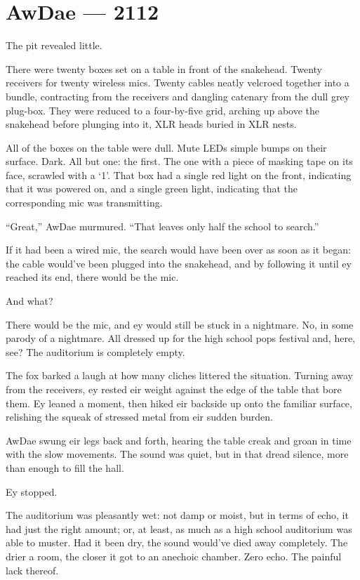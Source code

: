 \hypertarget{rj-brewster-2112}{%
\chapter*{AwDae — 2112}\label{rj-brewster-2112}}

The pit revealed little.

There were twenty boxes set on a table in front of the snakehead. Twenty receivers for twenty wireless mics. Twenty cables neatly velcroed together into a bundle, contracting from the receivers and dangling catenary from the dull grey plug-box. They were reduced to a four-by-five grid, arching up above the snakehead before plunging into it, XLR heads buried in XLR nests.

All of the boxes on the table were dull. Mute LEDs simple bumps on their surface. Dark. All but one: the first. The one with a piece of masking tape on its face, scrawled with a `1'. That box had a single red light on the front, indicating that it was powered on, and a single green light, indicating that the corresponding mic was transmitting.

``Great,'' AwDae murmured. ``That leaves only half the school to search.''

If it had been a wired mic, the search would have been over as soon as it began: the cable would've been plugged into the snakehead, and by following it until ey reached its end, there would be the mic.

And what?

There would be the mic, and ey would still be stuck in a nightmare. No, in some parody of a nightmare. All dressed up for the high school pops festival and, here, see? The auditorium is completely empty.

The fox barked a laugh at how many cliches littered the situation. Turning away from the receivers, ey rested eir weight against the edge of the table that bore them. Ey leaned a moment, then hiked eir backside up onto the familiar surface, relishing the squeak of stressed metal from eir sudden burden.

AwDae swung eir legs back and forth, hearing the table creak and groan in time with the slow movements. The sound was quiet, but in that dread silence, more than enough to fill the hall.

Ey stopped.

The auditorium was pleasantly wet: not damp or moist, but in terms of echo, it had just the right amount; or, at least, as much as a high school auditorium was able to muster. Had it been dry, the sound would've died away completely. The drier a room, the closer it got to an anechoic chamber. Zero echo. The painful lack thereof.

